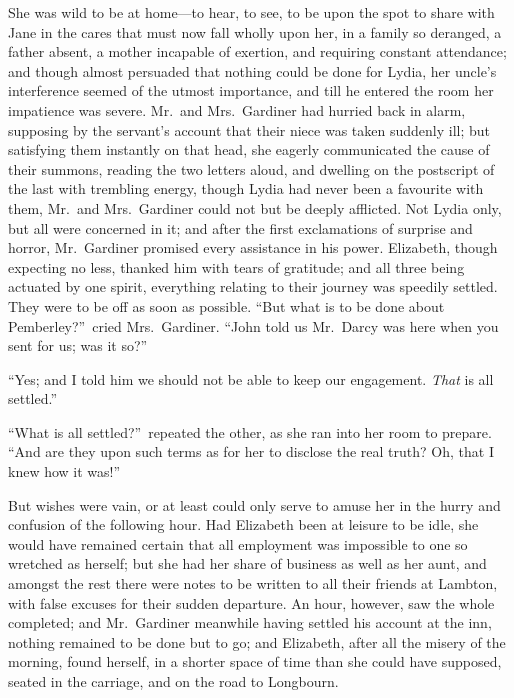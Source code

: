 \documentclass[12pt,english]{book}
\begin{document}
She was wild to be at home\mbox{---}to hear, to see, to be upon the
spot to share with Jane in the cares that must now fall wholly upon
her, in a family so deranged, a father absent, a mother incapable
of exertion, and requiring constant attendance; and though almost
persuaded that nothing could be done for Lydia, her uncle's interference
seemed of the utmost importance, and till he entered the room her
impatience was severe. Mr.\ and Mrs.\ Gardiner had hurried back
in alarm, supposing by the servant's account that their niece was
taken suddenly ill; but satisfying them instantly on that head, she
eagerly communicated the cause of their summons, reading the two letters
aloud, and dwelling on the postscript of the last with trembling energy,
though Lydia had never been a favourite with them, Mr.\ and Mrs.\ Gardiner
could not but be deeply afflicted. Not Lydia only, but all were concerned
in it; and after the first exclamations of surprise and horror, Mr.\ Gardiner
promised every assistance in his power. Elizabeth, though expecting
no less, thanked him with tears of gratitude; and all three being
actuated by one spirit, everything relating to their journey was speedily
settled. They were to be off as soon as possible. {}``But what is
to be done about Pemberley?''\ cried Mrs.\ Gardiner. {}``John
told us Mr.\ Darcy was here when you sent for us; was it so?''\ 

{}``Yes; and I told him we should not be able to keep our engagement.
\textit{That} is all settled.''

{}``What is all settled?''\ repeated the other, as she ran into
her room to prepare. {}``And are they upon such terms as for her
to disclose the real truth? Oh, that I knew how it was!''\ 

But wishes were vain, or at least could only serve to amuse her in
the hurry and confusion of the following hour. Had Elizabeth been
at leisure to be idle, she would have remained certain that all employment
was impossible to one so wretched as herself; but she had her share
of business as well as her aunt, and amongst the rest there were notes
to be written to all their friends at Lambton, with false excuses
for their sudden departure. An hour, however, saw the whole completed;
and Mr.\ Gardiner meanwhile having settled his account at the inn,
nothing remained to be done but to go; and Elizabeth, after all the
misery of the morning, found herself, in a shorter space of time than
she could have supposed, seated in the carriage, and on the road to
Longbourn.
\end{document}
